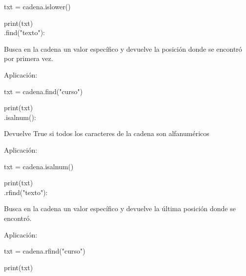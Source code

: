 {{\begin{minipage}{14cm}
{{					txt = cadena.islower()
					
					{\color{red!70!blue}print}(txt)\\
					
					.find("{}texto{}"):
					
					{ \color{blue}
						Busca en la cadena un valor específico y devuelve la posición donde se 
						encontró por primera vez.}	
					
					Aplicación: 
					
					txt = cadena.find("{}curso{}")
					
					{\color{red!70!blue}print}(txt)\\
					
					
					.isalnum(): 
					
					{ \color{blue}
						Devuelve True si todos los caracteres de la cadena son alfanuméricos}
					
					Aplicación: 
					
					txt = cadena.isalnum()
					
					{\color{red!70!blue}print}(txt)\\
					
					
					
					
					.rfind("{}texto{}"):
					
					{ \color{blue}
						Busca en la cadena un valor específico y devuelve la última posición 
						donde se encontró{}.}
					
					Aplicación: 
					
					txt = cadena.rfind({}"{}curso{}"{})
					
					{\color{red!70!blue}print}(txt)\\		
					
			}}
			
		\end{minipage}
		
}}









